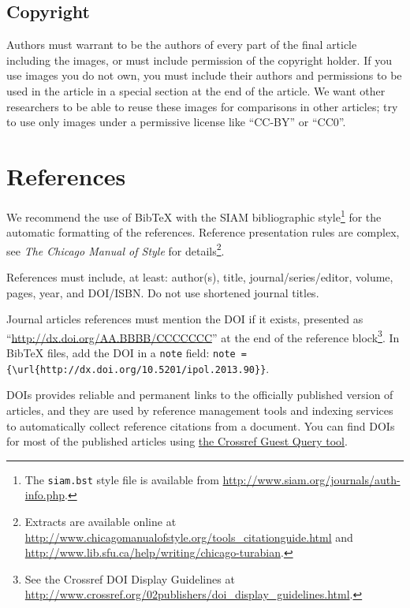 \documentclass{ipol}
\begin{document}
\subsection{Copyright}

Authors must warrant to be the authors of every part of the final
article including the images, or must include permission of the
copyright holder. If you use images you do not own, you must include
their authors and permissions to be used in the article in a special
section at the end of the article. We want other researchers to be
able to reuse these images for comparisons in other articles; try to
use only images under a permissive license like ``CC-BY'' or ``CC0''.

\section{References}

We recommend the use of BibTeX with the SIAM bibliographic
style\footnote{The \verb|siam.bst| style file is available from
  \url{http://www.siam.org/journals/auth-info.php}.} for the automatic
formatting of the references. Reference presentation rules are
complex, see \emph{The Chicago Manual of Style} for
details\footnote{Extracts are available online at
  \url{http://www.chicagomanualofstyle.org/tools_citationguide.html}
  and \url{http://www.lib.sfu.ca/help/writing/chicago-turabian}.}.

References must include, at least: author(s), title,
journal/series/editor, volume, pages, year, and DOI/ISBN\@. Do
not use shortened journal titles.

Journal articles references must mention the DOI if it exists, presented
as ``\url{http://dx.doi.org/AA.BBBB/CCCCCCC}'' at the end of the
reference block\footnote{See the Crossref DOI Display Guidelines at
  \url{http://www.crossref.org/02publishers/doi\_display\_guidelines.html}.}.
In BibTeX files, add the DOI in a \verb|note| field: \verb|note = {\url{http://dx.doi.org/10.5201/ipol.2013.90}}|.

DOIs provides reliable and permanent links to the officially published
version of articles, and they are used by reference management tools
and indexing services to automatically collect reference citations
from a document. You can find DOIs for most of the published articles
using \href{http://www.crossref.org/guestquery/}{the Crossref Guest
  Query tool}.
\end{document}
